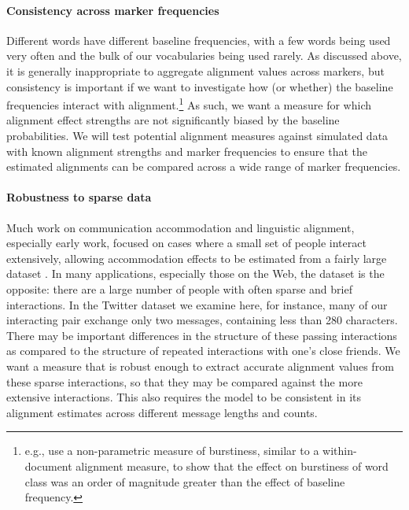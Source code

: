 \documentclass{acm_proc_article-sp}
\begin{document}
\paragraph{Consistency across marker frequencies} Different words have different baseline frequencies, with a few words being used very often and the bulk of our vocabularies being used rarely. As discussed above, it is generally inappropriate to aggregate alignment values across markers, but consistency is important if we want to investigate how (or whether) the baseline frequencies interact with alignment.\footnote{e.g., \cite{Church2000} use a non-parametric measure of burstiness, similar to a within-document alignment measure, to show that the effect on burstiness of word class was an order of magnitude greater than the effect of baseline frequency.}   As such, we want a measure for which alignment effect strengths are not significantly biased by the baseline probabilities.  We will test potential alignment measures against simulated data with known alignment strengths and marker frequencies to ensure that the estimated alignments can be compared across a wide range of marker frequencies.  %

\paragraph{Robustness to sparse data} Much work on communication accommodation and linguistic alignment, especially early work, focused on cases where a small set of people interact extensively, allowing accommodation effects to be estimated from a fairly large dataset \cite{Ferrara1991,GonzalesHancockPennebaker2010,IrelandEtAl2011}.  In many applications, especially those on the Web, the dataset is the opposite: there are a large number of people with often sparse and brief interactions.  In the Twitter dataset we examine here, for instance, many of our interacting pair exchange only two messages, containing less than 280 characters.  There may be important differences in the structure of these passing interactions as compared to the structure of repeated interactions with one's close friends.  We want a measure that is robust enough to extract accurate alignment values from these sparse interactions, so that they may be compared against the more extensive interactions.  This also requires the model to be consistent in its alignment estimates across different message lengths and counts. %
\end{document}
